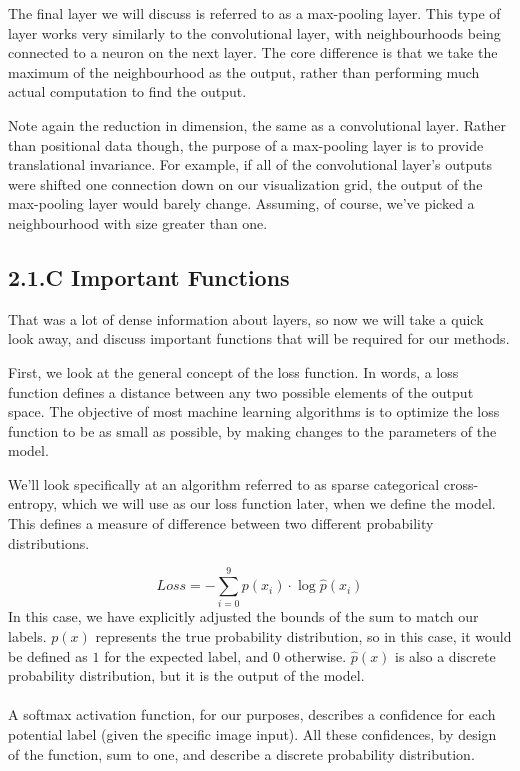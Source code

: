 \documentclass{article}
\begin{document}
The final layer we will discuss is referred to as a max-pooling layer. This type of layer works very similarly to the convolutional layer, with neighbourhoods being connected to a neuron on the next layer. The core difference is that we take the maximum of the neighbourhood as the output, rather than performing much actual computation to find the output.

Note again the reduction in dimension, the same as a convolutional layer. Rather than positional data though, the purpose of a max-pooling layer is to provide translational invariance. For example, if all of the convolutional layer’s outputs were shifted one connection down on our visualization grid, the output of the max-pooling layer would barely change. Assuming, of course, we’ve picked a neighbourhood with size greater than one.\\
\subsection*{2.1.C Important Functions}
That was a lot of dense information about layers, so now we will take a quick look away, and discuss important functions that will be required for our methods.

First, we look at the general concept of the loss function. In words, a loss function defines a distance between any two possible elements of the output space. The objective of most machine learning algorithms is to optimize the loss function to be as small as possible, by making changes to the parameters of the model.

We’ll look specifically at an algorithm referred to as sparse categorical cross-entropy, which we will use as our loss function later, when we define the model. This defines a measure of difference between two different probability distributions.

\[Loss = -\sum_{i=0}^{9}p(x_i)\cdot \log \hat p(x_i) \]
In this case, we have explicitly adjusted the bounds of the sum to match our labels. $p(x)$ represents the true probability distribution, so in this case, it would be defined as  $1$ for the expected label, and $0$ otherwise. $\hat p(x)$ is also a discrete probability distribution, but it is the output of the model.\\\\

A softmax activation function, for our purposes, describes a confidence for each potential label (given the specific image input). All these confidences, by design of the function, sum to one, and describe a discrete probability distribution.
\end{document}
